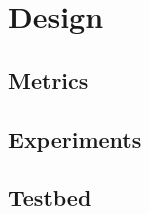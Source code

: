 \chapter{Design} %
\label{chap:Design}

\section{Metrics} %
\label{sec:Metrics}



\section{Experiments} %
\label{sec:Experiments}



\section{Testbed} %
\label{sec:Testbed_Design}



